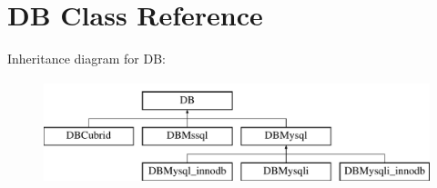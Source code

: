 \hypertarget{classDB}{\section{D\-B Class Reference}
\label{classDB}
}
Inheritance diagram for D\-B\-:\begin{figure}[H]
\begin{center}
\leavevmode
\includegraphics[height=3.000000cm]{classDB}
\end{center}
\end{figure}
